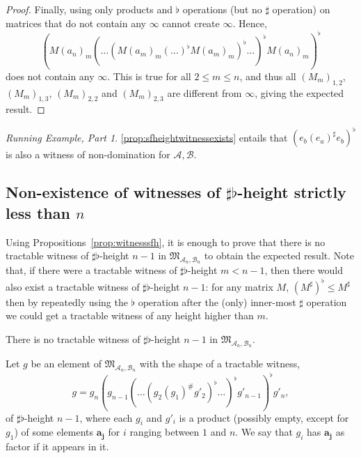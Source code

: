 \documentclass{lmcs}
\theoremstyle{remark}
\newcommand{\ideal}{\mathfrak{M}}
\newcommand{\autA}{\mathcal{A}}
\newcommand{\autB}{\mathcal{B}}
\theoremstyle{remark}
\newtheorem{runningexample/}{Running Example, Part}
\newenvironment{runningexample}
  {\renewcommand{\qedsymbol}{\color{darkgray}\ensuremath{\lrcorner}}%
   \pushQED{\qed}\begin{runningexample/}}
  {\popQED\end{runningexample/}}
\begin{document}
\begin{proof}
Finally, using only products and $\flat$ operations (but no $\sharp$ operation) on matrices that do not contain any $\infty$ cannot create $\infty$. Hence, 
$$(M(a_n)_{m} (\ldots (M(a_{m})_{m}(...)^\flat M(a_{m})_{m})^\flat \ldots)^\flat M(a_n)_{m})^{\flat}$$
does not contain any $\infty$. This is true for all $2 \leq m \leq n$, and thus all
$(M_m)_{1,2}$, $(M_m)_{1,3}$, $(M_m)_{2,2}$  and $(M_m)_{2,3}$ are different from $\infty$, giving the expected result.
\end{proof}

\begin{runningexample}
\cref{prop:sfheightwitnessexists} entails that $(e_b(e_a)^\sharp e_b)^\flat$ is also a witness of non-domination for $\autA,\autB$.
\end{runningexample}

\subsection{Non-existence of witnesses of \texorpdfstring{$\sharp\flat$}{\#♭}-height strictly less than \texorpdfstring{$n$}{n}}
\label{section:nonexistence}

Using Propositions~\ref{prop:witnesssfh}, it is enough to prove that there is no tractable witness of $\sharp\flat$-height $n-1$ in $\ideal_{\autA_n,\autB_n}$ to obtain the expected result. Note that, if there were a tractable witness of  $\sharp\flat$-height $m < n-1$, then there would also exist a tractable witness of  $\sharp\flat$-height $n-1$: for any matrix $M$, $(M^\sharp)^\flat \leq M^\sharp$ then by repeatedly using the $\flat$ operation after the (only) inner-most $\sharp$ operation we could get a tractable witness of any height higher than $m$.






\begin{prop}
\label{prop:last}
There is no tractable witness of $\sharp\flat$-height $n-1$ in $\ideal_{\autA_n,\autB_n}$.
\end{prop}

Let $g$ be an element of $\ideal_{\autA_n,\autB_n}$ with the shape of a tractable witness, \[g = g_n (g_{n-1} (\dots (g_{2} (g_{1})^\#g'_{2})^\flat \dots)^\flat g'_{n-1})^\flat g'_{n},\] 
of $\sharp\flat$-height $n-1$, where each $g_i$ and $g'_i$ is a product (possibly empty, except for $g_1$) of some elements $\boldsymbol{a_j}$ for $i$ ranging between $1$ and $n$. We say that $g_i$ has $\boldsymbol{a_j}$ as factor if it appears in it.
\end{document}
